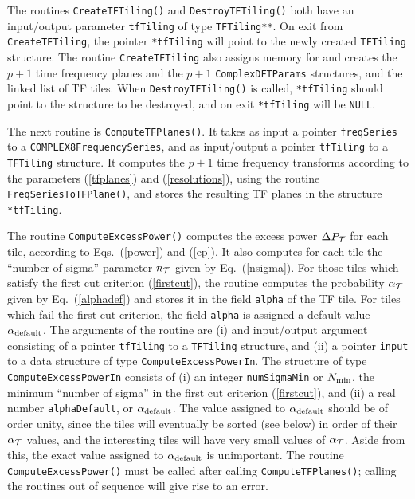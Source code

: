 \documentclass{article}
\begin{document}
The routines \verb+CreateTFTiling()+ and \verb+DestroyTFTiling()+ both
have an input/output parameter \verb+tfTiling+ of type
\verb+TFTiling**+.  On exit from \verb+CreateTFTiling+, the pointer
\verb+*tfTiling+ will point to the newly created \verb+TFTiling+
structure.  The routine \verb+CreateTFTiling+ also assigns memory for
and creates the $p+1$ time frequency planes and the $p+1$
\verb+ComplexDFTParams+ structures, and the linked list of TF tiles.
When \verb+DestroyTFTiling()+ is called, 
\verb+*tfTiling+ should point to the structure to be destroyed, and on
exit \verb+*tfTiling+ will be \verb+NULL+.






The next routine is \verb+ComputeTFPlanes()+.  It takes as input a
pointer \verb+freqSeries+ to a \verb+COMPLEX8FrequencySeries+, and as
input/output a pointer \verb+tfTiling+ to a \verb+TFTiling+ structure.  It
computes the $p+1$ time frequency transforms according to the parameters
(\ref{tfplanes}) and (\ref{resolutions}), using the routine
\verb+FreqSeriesToTFPlane()+, and stores the resulting TF planes in the
structure \verb+*tfTiling+.


The routine \verb+ComputeExcessPower()+ computes the excess
power $\Delta P_{\cal T}$ for each tile, according to Eqs.\ (\ref{power})
and (\ref{ep}).  It also computes for each tile the ``number of
sigma'' parameter $n_{\cal T}$ given by Eq.\ (\ref{nsigma}).  For
those tiles which satisfy 
the first cut criterion (\ref{firstcut}), the routine computes the probability
$\alpha_{\cal T}$ given by Eq.\ (\ref{alphadef}) and stores it in the field
\verb+alpha+ of the TF tile.  For tiles which fail the first cut
criterion, the field \verb+alpha+ is assigned a default value
$\alpha_{\rm default}$.  The arguments of the routine are (i) and
input/output argument consisting of a pointer
\verb+tfTiling+ to a \verb+TFTiling+ structure, and (ii)
a pointer \verb+input+ to a data structure of
type \verb+ComputeExcessPowerIn+.  The structure of type
\verb+ComputeExcessPowerIn+ consists of
(i) an integer \verb+numSigmaMin+ or $N_{\rm min}$,
the minimum ``number of sigma'' in the first cut criterion
(\ref{firstcut}), and (ii) a real number \verb+alphaDefault+, or
$\alpha_{\rm default}$.  The value assigned to $\alpha_{\rm default}$
should be of order unity, since the tiles will eventually be sorted
(see below) in order of their $\alpha_{\cal T}$ values, and the interesting
tiles will have very small values of $\alpha_{\cal T}$.  Aside from
this, the exact value assigned to $\alpha_{\rm default}$  is
unimportant.  The routine \verb+ComputeExcessPower()+ must be called
after calling \verb+ComputeTFPlanes()+; calling the routines out of
sequence will give rise to an error.
\end{document}
